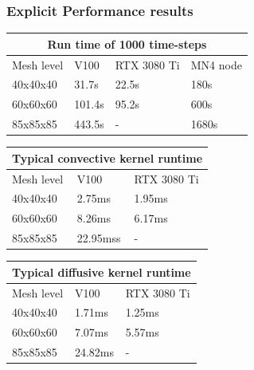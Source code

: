 \begin{frame}
	\frametitle{Explicit Performance results}
	\begin{table}[H]
		\centering
		\begin{tabular}{|p{2cm}||p{2cm}|p{2cm}|p{2cm}|}
			\hline
			\multicolumn{4}{|c|}{Run time of 1000 time-steps} \\
			\hline
			Mesh level&V100&RTX 3080 Ti&MN4 node\\
			\hline
			40x40x40 & 31.7s & 22.5s & 180s\\
			60x60x60 & 101.4s & 95.2s & 600s\\
			85x85x85 & 443.5s & - & 1680s\\
			\hline
		\end{tabular}
		\label{table:tstepTime}
	\end{table}
	\begin{table}[H]
		\centering
		\begin{tabular}{|p{3cm}||p{3cm}|p{3cm}|}
			\hline
			\multicolumn{3}{|c|}{Typical convective kernel runtime} \\
			\hline
			Mesh level&V100&RTX 3080 Ti\\
			\hline
			40x40x40 & 2.75ms & 1.95ms\\
			60x60x60 & 8.26ms & 6.17ms\\
			85x85x85 & 22.95mss & -\\
			\hline
		\end{tabular}
		\label{table:convKern}
	\end{table}
	
	\begin{table}[H]
		\centering
		\begin{tabular}{|p{3cm}||p{3cm}|p{3cm}|}
			\hline
			\multicolumn{3}{|c|}{Typical diffusive kernel runtime} \\
			\hline
			Mesh level&V100&RTX 3080 Ti\\
			\hline
			40x40x40 & 1.71ms & 1.25ms\\
			60x60x60 & 7.07ms & 5.57ms\\
			85x85x85 & 24.82ms & -\\
			\hline
		\end{tabular}
		\label{table:diffKern}
	\end{table}
\end{frame}

